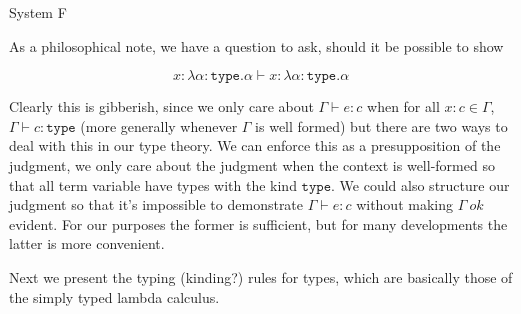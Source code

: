 \documentclass{amsart}
\newcommand{\type}{\ensuremath{\mathtt{type}}}
\begin{document}
\begin{section}{System F}

As a philosophical note, we have a question to ask, should it be
possible to show

\[
  x : \lambda \alpha : \type. \alpha \vdash x : \lambda \alpha : \type. \alpha
\]

Clearly this is gibberish, since we only care about
$\Gamma \vdash e : c$ when for all $x : c \in \Gamma$,
$\Gamma \vdash c : \type$ (more generally whenever $\Gamma$ is well
formed) but there are two ways to deal with this in our type
theory. We can enforce this as a presupposition of the judgment, we
only care about the judgment when the context is well-formed so that
all term variable have types with the kind $\type$. We could also
structure our judgment so that it's impossible to demonstrate
$\Gamma \vdash e : c$ without making $\Gamma\ ok$ evident. For our purposes the former is sufficient, but for many developments the
latter is more convenient.

Next we present the typing (kinding?) rules for types, which are basically those of the simply typed lambda calculus.



\end{section}
\end{document}
